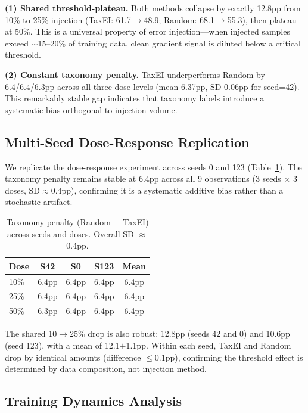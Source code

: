 \documentclass[11pt,a4paper]{article}
\begin{document}
\noindent\textbf{(1) Shared threshold-plateau.} Both methods collapse by exactly 12.8pp from 10\% to 25\% injection (TaxEI: 61.7$\to$48.9; Random: 68.1$\to$55.3), then plateau at 50\%. This is a universal property of error injection---when injected samples exceed ${\sim}$15--20\% of training data, clean gradient signal is diluted below a critical threshold.

\noindent\textbf{(2) Constant taxonomy penalty.} TaxEI underperforms Random by 6.4/6.4/6.3pp across all three dose levels (mean 6.37pp, SD 0.06pp for seed=42). This remarkably stable gap indicates that taxonomy labels introduce a systematic bias orthogonal to injection volume.

\subsection{Multi-Seed Dose-Response Replication}
\label{sec:multiseed}

We replicate the dose-response experiment across seeds 0 and 123 (Table~\ref{tab:multiseed_penalty}). The taxonomy penalty remains stable at 6.4pp across all 9 observations (3 seeds $\times$ 3 doses, SD${\approx}$0.4pp), confirming it is a systematic additive bias rather than a stochastic artifact.

\begin{table}[t]
\centering
\small
\begin{tabular}{lcccc}
\toprule
\textbf{Dose} & \textbf{S42} & \textbf{S0} & \textbf{S123} & \textbf{Mean} \\
\midrule
10\% & 6.4pp & 6.4pp & 6.4pp & 6.4pp \\
25\% & 6.4pp & 6.4pp & 6.4pp & 6.4pp \\
50\% & 6.3pp & 6.4pp & 6.4pp & 6.4pp \\
\bottomrule
\end{tabular}
\caption{Taxonomy penalty (Random $-$ TaxEI) across seeds and doses. Overall SD $\approx$ 0.4pp.}
\label{tab:multiseed_penalty}
\end{table}

The shared 10$\to$25\% drop is also robust: 12.8pp (seeds 42 and 0) and 10.6pp (seed 123), with a mean of 12.1$\pm$1.1pp. Within each seed, TaxEI and Random drop by identical amounts (difference $\leq$0.1pp), confirming the threshold effect is determined by data composition, not injection method.

\subsection{Training Dynamics Analysis}
\label{sec:dynamics}
\end{document}
